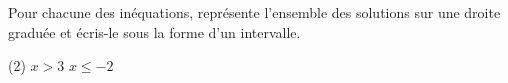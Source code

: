 %
%
    Pour chacune des inéquations, représente l'ensemble des solutions sur une droite graduée et écris-le sous la forme d'un intervalle.
    \begin{tasks}(2)
        \task $x > 3$
        \task $x \le -2$
    \end{tasks}
